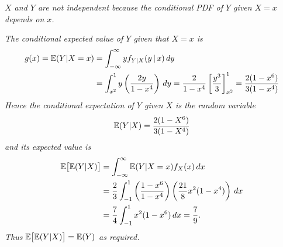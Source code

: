 \begin{solution}
\it %
$X$ and $Y$ are not independent because the conditional PDF of $Y$ given $X=x$ depends on $x$.

\it %
The conditional expected value of $Y$ given that $X=x$ is
\begin{align*}
g(x) = \mathbb{E}(Y|X=x) 
	& = \int_{-\infty}^{\infty} y f_{Y|X}(y\,|\,x)\,dy \\
	& = \int_{x^2}^1 y \left(\frac{2y}{1-x^4}\right)\,dy 
	= \frac{2}{1-x^4}\left[\frac{y^3}{3}\right]_{x^2}^1
	= \frac{2(1-x^6)}{3(1-x^4)} 
\end{align*}	
Hence the conditional expectation of $Y$ given $X$ is the random variable 
\[
\mathbb{E}(Y|X)=\displaystyle\frac{2(1-X^6)}{3(1-X^4)}
\]
and its expected value is  
\begin{align*}
\mathbb{E}\big[\mathbb{E}(Y|X)\big] 
	& = \int_{-\infty}^{\infty} \mathbb{E}(Y|X=x)f_X(x)\,dx \\
	& = \frac{2}{3}\int_{-1}^{1} \left(\frac{1-x^6}{1-x^4}\right)\left(\frac{21}{8}x^2(1-x^4)\right)\,dx \\
	& = \frac{7}{4}\int_{-1}^{1} x^2(1-x^6)\,dx 
	= \frac{7}{9}.
\end{align*}	
Thus $\mathbb{E}\big[\mathbb{E}(Y|X)\big]=\mathbb{E}(Y)$ as required.
%
%

\end{solution}
